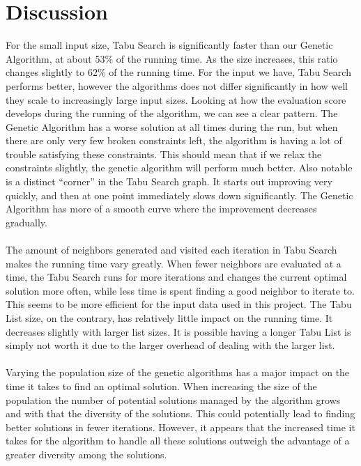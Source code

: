 \documentclass[titlepage,a4paper]{article}
\begin{document}
\section{Discussion}
For the small input size, Tabu Search is significantly faster than our Genetic Algorithm, at about 53\% of the running time. As the size increases, this ratio changes slightly to 62\% of the running time. For the input we have, Tabu Search performs better, however the algorithms does not differ significantly in how well they scale to increasingly large input sizes. Looking at how the evaluation score develops during the running of the algorithm, we can see a clear pattern. The Genetic Algorithm has a worse solution at all times during the run, but when there are only very few broken constraints left, the algorithm is having a lot of trouble satisfying these constraints. This should mean that if we relax the constraints slightly, the genetic algorithm will perform much better. Also notable is a distinct ``corner'' in the Tabu Search graph. It starts out improving very quickly, and then at one point immediately slows down significantly. The Genetic Algorithm has more of a smooth curve where the improvement decreases gradually.
 \\\\
The amount of neighbors generated and visited each iteration in Tabu Search makes the running time vary greatly. When fewer neighbors are evaluated at a time, the Tabu Search runs for more iterations and changes the current optimal solution more often, while less time is spent finding a good neighbor to iterate to. This seems to be more efficient for the input data used in this project.
The Tabu List size, on the contrary, has relatively little impact on the running time. It decreases slightly with larger list sizes. It is possible having a longer Tabu List is simply not worth it due to the larger overhead of dealing with the larger list. \\\\
Varying the population size of the genetic algorithms has a major impact on the time it takes to find an optimal solution. When increasing the size of the population the number of potential solutions managed by the algorithm grows and with that the diversity of the solutions. This could potentially lead to finding better solutions in fewer iterations. However, it appears that the increased time it takes for the algorithm to handle all these solutions outweigh the advantage of a greater diversity among the solutions. \\\\
\end{document}
